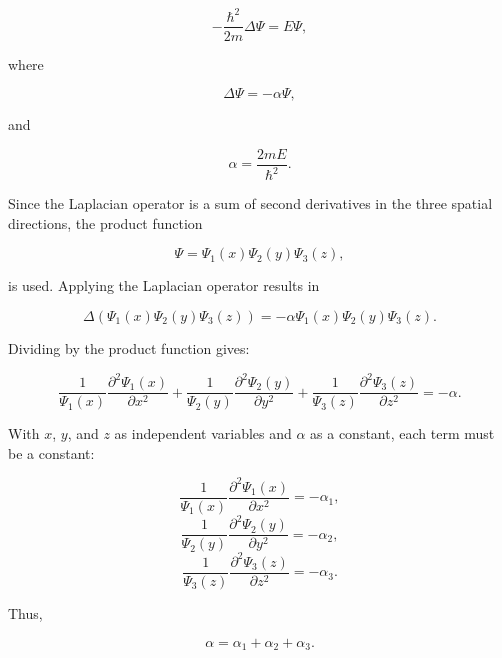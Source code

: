 \documentclass{article}
\begin{document}
\begin{equation*}
-\frac{\hbar^2}{2m} \Delta \Psi = E \Psi, 
\end{equation*}

where

\begin{equation*}
\Delta \Psi = -\alpha \Psi, 
\end{equation*}

and

\begin{equation*}
\alpha = \frac{2mE}{\hbar^2}.
\end{equation*}

Since the Laplacian operator is a sum of second derivatives in the three spatial directions, the product function

\begin{equation*}
\Psi = \Psi_1(x) \Psi_2(y) \Psi_3(z), 
\end{equation*}

is used. Applying the Laplacian operator results in

\begin{equation*}
	\Delta \left( \Psi_1(x) \Psi_2(y) \Psi_3(z) \right) = -\alpha \Psi_1(x) \Psi_2(y) \Psi_3(z).
\end{equation*}
	

Dividing by the product function gives:

\begin{equation*}
\frac{1}{\Psi_1(x)} \frac{\partial^2 \Psi_1(x)}{\partial x^2} + \frac{1}{\Psi_2(y)} \frac{\partial^2 \Psi_2(y)}{\partial y^2} + \frac{1}{\Psi_3(z)} \frac{\partial^2 \Psi_3(z)}{\partial z^2} = -\alpha. 
\end{equation*}

With $x$, $y$, and $z$ as independent variables and $\alpha$ as a constant, each term must be a constant:

\begin{equation*}
\frac{1}{\Psi_1(x)} \frac{\partial^2 \Psi_1(x)}{\partial x^2} = -\alpha_1, 
\end{equation*}
\begin{equation*}
\frac{1}{\Psi_2(y)} \frac{\partial^2 \Psi_2(y)}{\partial y^2} = -\alpha_2, 
\end{equation*}
\begin{equation*}
\frac{1}{\Psi_3(z)} \frac{\partial^2 \Psi_3(z)}{\partial z^2} = -\alpha_3. 
\end{equation*}

Thus,

\begin{equation*}
\alpha = \alpha_1 + \alpha_2 + \alpha_3. 
\end{equation*}
\end{document}
